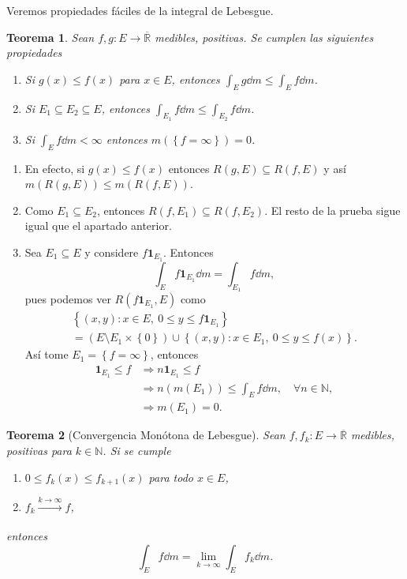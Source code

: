 \documentclass[12pt]{article}
\theoremstyle{plain}
\newtheorem{Th}{Teorema}[subsection]   %
\theoremstyle{definition}
\theoremstyle{remark}
\numberwithin{equation}{section}
\newcommand{\bN}{\mathbb{N}}        %
\newcommand{\bR}{\mathbb{R}}        %
\newcommand{\ind}{\mathbf{1}}       %
\renewcommand{\leq}{\leqslant}      %
\renewcommand{\:}{\colon}           %
\newcommand{\conj}[1]{\left\lbrace#1\right\rbrace}
\begin{document}
\begin{multicols}{2}
Veremos propiedades fáciles de la integral de Lebesgue.

\begin{Th}
  Sean $f,g\: E\to\overline{\bR}$ medibles, positivas. Se cumplen las siguientes propiedades
  \begin{enumerate}
    \item Si $g(x)\leq f(x)$ para $x\in E$, entonces $\int_{E}g\dd m\leq \int_{E}f\dd m$.
    \item Si $E_1\subseteq E_2\subseteq E$, entonces $\int_{E_1}f\dd m\leq \int_{E_2}f\dd m$.
    \item Si $\int_{E}f\dd m<\infty$ entonces $m(\conj{f=\infty})=0$.
  \end{enumerate}
\end{Th}

\begin{ptcbp}
\begin{enumerate}
  \item En efecto, si $g(x)\leq f(x)$ entonces $R(g,E)\subseteq R(f,E)$ y así $m(R(g,E))\leq m(R(f,E))$.
  \item Como $E_1\subseteq E_2$, entonces $R(f,E_1)\subseteq R(f,E_2)$. El resto de la prueba sigue igual que el apartado anterior.
  \item Sea $E_1\subseteq E$ y considere $f\ind_{E_1}$. Entonces
  $$\int_{E}f\ind_{E_1}\dd m=\int_{E_1}f\dd m,$$
  pues podemos ver $R(f\ind_{E_1},E)$ como
  \begin{gather*}
    \conj{(x,y)\: x\in E,\ 0\leq y\leq f\ind_{E_1}}\\
    =(E\setminus E_1\times\conj{0})\cup\conj{(x,y)\: x\in E_1,\ 0\leq y\leq f(x)}.
  \end{gather*}
  Así tome $E_1=\conj{f=\infty}$, entonces
  \begin{align*}
    \ind_{E_1}\leq f &\Rightarrow n\ind_{E_1}\leq f\\
    &\Rightarrow n(m(E_1))\leq\int_{E}f\dd m,\quad\forall n\in\bN,\\
    &\Rightarrow m(E_1)=0.
  \end{align*}

\end{enumerate}
\end{ptcbp}

\begin{Th}[Convergencia Monótona de Lebesgue]\label{thm:MCTLebesguePositive}
  Sean $f,f_k\: E\to\overline{\bR}$ medibles, positivas para $k\in\bN$. Si se cumple
\begin{enumerate}
  \item $0\leq f_k(x)\leq f_{k+1}(x)$ para todo $x\in E$,
  \item $f_k\xrightarrow[]{k\to\infty}f$,
\end{enumerate}
entonces $$\int_{E}f\dd m=\lim_{k\to\infty}\int_{E}f_k\dd m.$$
\end{Th}


\end{multicols}
\end{document}

